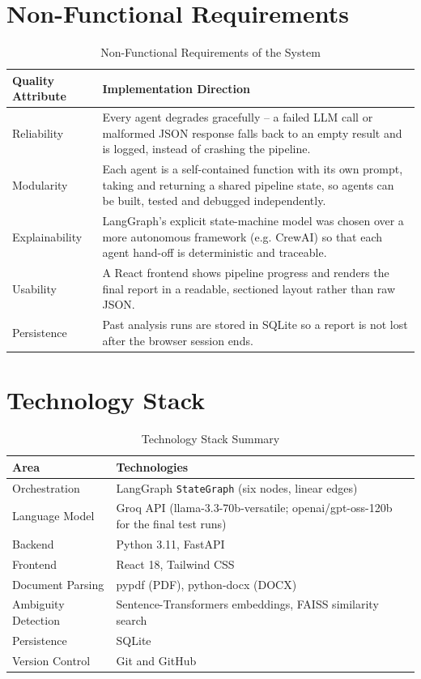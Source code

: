 \documentclass[12pt,a4paper,openany]{report}
\begin{document}
\section{Non-Functional Requirements}
\begin{table}[H]
\centering
\caption{Non-Functional Requirements of the System}
\label{tab:nonfunctional}
\begin{tabularx}{\textwidth}{|>{\raggedright\arraybackslash}p{3.6cm}|X|}
\hline
\textbf{Quality Attribute} & \textbf{Implementation Direction} \\
\hline
Reliability & Every agent degrades gracefully -- a failed LLM call or malformed JSON response falls back to an empty result and is logged, instead of crashing the pipeline. \\
\hline
Modularity & Each agent is a self-contained function with its own prompt, taking and returning a shared pipeline state, so agents can be built, tested and debugged independently. \\
\hline
Explainability & LangGraph's explicit state-machine model was chosen over a more autonomous framework (e.g. CrewAI) so that each agent hand-off is deterministic and traceable. \\
\hline
Usability & A React frontend shows pipeline progress and renders the final report in a readable, sectioned layout rather than raw JSON. \\
\hline
Persistence & Past analysis runs are stored in SQLite so a report is not lost after the browser session ends. \\
\hline
\end{tabularx}
\end{table}

\section{Technology Stack}
\begin{table}[H]
\centering
\caption{Technology Stack Summary}
\label{tab:techstack}
\begin{tabularx}{\textwidth}{|p{3.2cm}|X|}
\hline
\textbf{Area} & \textbf{Technologies} \\
\hline
Orchestration & LangGraph \texttt{StateGraph} (six nodes, linear edges) \\
\hline
Language Model & Groq API (llama-3.3-70b-versatile; openai/gpt-oss-120b for the final test runs) \\
\hline
Backend & Python 3.11, FastAPI \\
\hline
Frontend & React 18, Tailwind CSS \\
\hline
Document Parsing & pypdf (PDF), python-docx (DOCX) \\
\hline
Ambiguity Detection & Sentence-Transformers embeddings, FAISS similarity search \\
\hline
Persistence & SQLite \\
\hline
Version Control & Git and GitHub \\
\hline
\end{tabularx}
\end{table}
\FloatBarrier
\end{document}
